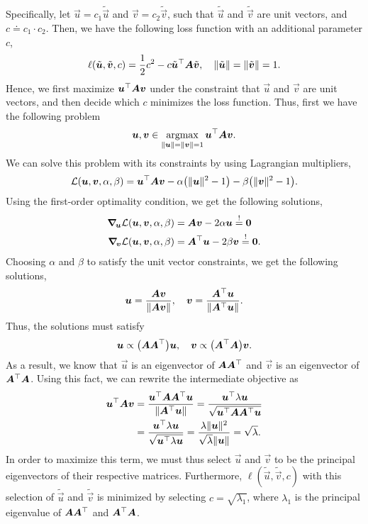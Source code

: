 Specifically, let $\vec{u} = c_1 \tilde{\vec{u}}$ and $\vec{v} = c_2 \tilde{\vec{v}}$, such that
$\tilde{\vec{u}}$ and $\tilde{\vec{v}}$ are unit vectors, and $c \doteq c_1 \cdot c_2$. Then, we
have the following loss function with an additional parameter $c$, \[
    \ell(\tilde{\vec{u}}, \tilde{\vec{v}}, c) = \frac{1}{2} c^2 - c \transpose{\tilde{\vec{u}}} \mat{A} \tilde{\vec{v}}, \quad \| \tilde{\vec{u}} \| = \| \tilde{\vec{v}} \| = 1.
\]
Hence, we first maximize $\transpose{\vec{u}} \mat{A} \vec{v}$ under the constraint that $\vec{u}$
and $\vec{v}$ are unit vectors, and then decide which $c$ minimizes the loss function. Thus, first
we have the following problem \[
    \vec{u}, \vec{v} \in \argmax_{\| \vec{u} \| = \| \vec{v} \| = 1} \transpose{\vec{u}} \mat{A} \vec{v}.
\]
We can solve this problem with its constraints by using Lagrangian multipliers, \[
    \mathcal{L}(\vec{u}, \vec{v}, \alpha, \beta) = \transpose{\vec{u}} \mat{A} \vec{v} - \alpha \lft(\| \vec{u} \|^2 - 1\rgt) - \beta \lft(\| \vec{v} \|^2 - 1\rgt).
\]
Using the first-order optimality condition, we get the following solutions,
\begin{align*}
    \grad{\mathcal{L}(\vec{u}, \vec{v}, \alpha, \beta)}{\vec{u}} & = \mat{A} \vec{v} - 2 \alpha \vec{u} \overset{!}{=} \vec{0}             \\
    \grad{\mathcal{L}(\vec{u}, \vec{v}, \alpha, \beta)}{\vec{v}} & = \transpose{\mat{A}} \vec{u} - 2 \beta \vec{v} \overset{!}{=} \vec{0}.
\end{align*}
Choosing $\alpha$ and $\beta$ to satisfy the unit vector constraints, we get the following solutions, \[
    \vec{u} = \frac{\mat{A} \vec{v}}{\| \mat{A} \vec{v} \|}, \quad \vec{v} = \frac{\transpose{\mat{A}} \vec{u}}{\| \transpose{\mat{A}} \vec{u} \|}.
\]
Thus, the solutions must satisfy \[
    \vec{u} \propto \lft( \mat{A}\transpose{\mat{A}} \rgt) \vec{u}, \quad \vec{v} \propto \lft( \transpose{\mat{A}} \mat{A} \rgt) \vec{v}.
\]
As a result, we know that $\vec{u}$ is an eigenvector of $\mat{A} \transpose{\mat{A}}$ and
$\vec{v}$ is an eigenvector of $\transpose{\mat{A}} \mat{A}$. Using this fact, we can rewrite the
intermediate objective as
\begin{align*}
    \transpose{\vec{u}} \mat{A} \vec{v} & = \frac{\transpose{\vec{u}} \mat{A} \transpose{\mat{A}} \vec{u}}{\| \transpose{\mat{A}} \vec{u} \|} = \frac{\transpose{\vec{u}} \lambda \vec{u}}{\sqrt{\transpose{\vec{u}} \mat{A} \transpose{\mat{A}} \vec{u}}} \\
                                        & = \frac{\transpose{\vec{u}} \lambda \vec{u}}{\sqrt{\transpose{\vec{u}} \lambda \vec{u}}} = \frac{\lambda \| \vec{u} \|^2}{\sqrt{\lambda} \| \vec{u} \|} = \sqrt{\lambda}.
\end{align*}
In order to maximize this term, we must thus select $\vec{u}$ and $\vec{v}$ to be the principal
eigenvectors of their respective matrices. Furthermore, $\ell(\tilde{\vec{u}}, \tilde{\vec{v}}, c)$
with this selection of $\tilde{\vec{u}}$ and $\tilde{\vec{v}}$ is minimized by selecting $c =
    \sqrt{\lambda_1}$, where $\lambda_1$ is the principal eigenvalue of $\mat{A}\transpose{\mat{A}}$
and $\transpose{\mat{A}} \mat{A}$.

